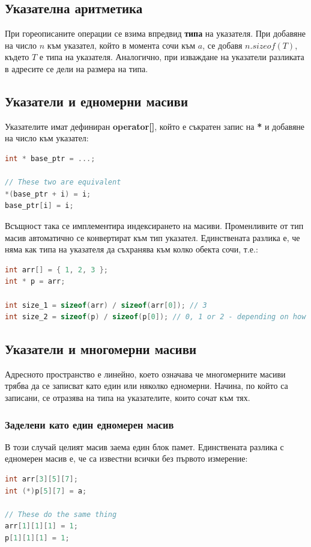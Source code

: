 \documentclass[fleqn,12pt]{article}
\begin{document}
\subsection{Указателна аритметика}
При гореописаните операции се взима впредвид \textbf{типа} на указателя. При добавяне на число $n$ към указател, който в момента сочи към $a$, се 
добавя $n . sizeof(T)$, където $T$ е типа на указателя. Аналогично, при изваждане на указатели разликата в адресите се дели на размера на типа.

\subsection{Указатели и едномерни масиви}

Указателите имат дефиниран \textbf{operator[]}, който е съкратен запис на \textbf{*} и добавяне на число към указател:
\begin{lstlisting}[language=C++, caption=Pointer example 3]
int * base_ptr = ...;

// These two are equivalent
*(base_ptr + i) = i;
base_ptr[i] = i;
\end{lstlisting}

Всъщност така се имплементира индексирането на масиви. Променливите от тип масив автоматично се конвертират към тип указател.
Единствената разлика е, че няма как типа на указателя да съхранява към колко обекта сочи, т.е.:

\begin{lstlisting}[language=C++, caption=Pointer example 3]
int arr[] = { 1, 2, 3 };
int * p = arr;

int size_1 = sizeof(arr) / sizeof(arr[0]); // 3
int size_2 = sizeof(p) / sizeof(p[0]); // 0, 1 or 2 - depending on how big the pointer is wrt to the int type
\end{lstlisting}

\subsection{Указатели и многомерни масиви}
Адресното пространство е линейно, което означава че многомерните масиви трябва да се записват като един или няколко едномерни.
Начина, по който са записани, се отразява на типа на указателите, които сочат към тях.

\subsubsection{Заделени като един едномерен масив}
В този случай целият масив заема един блок памет. Единствената разлика с едномерен масив е, че са известни всички без първото измерение:
\begin{lstlisting}[language=C++, caption=Multidimensional pointers]
int arr[3][5][7];
int (*)p[5][7] = a;

// These do the same thing
arr[1][1][1] = 1;
p[1][1][1] = 1;
\end{lstlisting}
\end{document}
